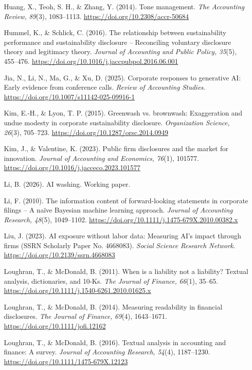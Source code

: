 Huang, X., Teoh, S. H., \& Zhang, Y. (2014). Tone management. \textit{The Accounting Review, 89}(3), 1083--1113. \url{https://doi.org/10.2308/accr-50684}

Hummel, K., \& Schlick, C. (2016). The relationship between sustainability performance and sustainability disclosure -- Reconciling voluntary disclosure theory and legitimacy theory. \textit{Journal of Accounting and Public Policy, 35}(5), 455--476. \url{https://doi.org/10.1016/j.jaccpubpol.2016.06.001}

Jia, N., Li, N., Ma, G., \& Xu, D. (2025). Corporate responses to generative AI: Early evidence from conference calls. \textit{Review of Accounting Studies}. \url{https://doi.org/10.1007/s11142-025-09916-1}

Kim, E.-H., \& Lyon, T. P. (2015). Greenwash vs. brownwash: Exaggeration and undue modesty in corporate sustainability disclosure. \textit{Organization Science, 26}(3), 705--723. \url{https://doi.org/10.1287/orsc.2014.0949}

Kim, J., \& Valentine, K. (2023). Public firm disclosures and the market for innovation. \textit{Journal of Accounting and Economics, 76}(1), 101577. \url{https://doi.org/10.1016/j.jacceco.2023.101577}

Li, B. (2026). AI washing. Working paper.

Li, F. (2010). The information content of forward-looking statements in corporate filings -- A naïve Bayesian machine learning approach. \textit{Journal of Accounting Research, 48}(5), 1049--1102. \url{https://doi.org/10.1111/j.1475-679X.2010.00382.x}

Liu, J. (2023). AI exposure without labor data: Measuring AI’s impact through firms (SSRN Scholarly Paper No. 4668083). \textit{Social Science Research Network}. \url{https://doi.org/10.2139/ssrn.4668083}

Loughran, T., \& McDonald, B. (2011). When is a liability not a liability? Textual analysis, dictionaries, and 10-Ks. \textit{The Journal of Finance, 66}(1), 35--65. \url{https://doi.org/10.1111/j.1540-6261.2010.01625.x}

Loughran, T., \& McDonald, B. (2014). Measuring readability in financial disclosures. \textit{The Journal of Finance, 69}(4), 1643--1671. \url{https://doi.org/10.1111/jofi.12162}

Loughran, T., \& McDonald, B. (2016). Textual analysis in accounting and finance: A survey. \textit{Journal of Accounting Research, 54}(4), 1187--1230. \url{https://doi.org/10.1111/1475-679X.12123}

